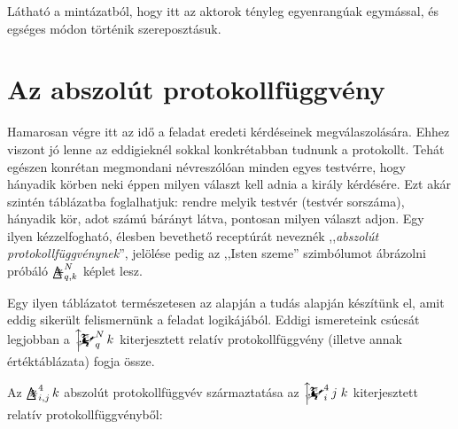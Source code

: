 \documentclass{article}
\newcommand{\eye}{\bigtriangleup\mspace{-14.607mu}\divideontimes}
\newcommand{\eyefun}[4]{\mathop{\eye}^{#1}_{#2,#3}#4}
\newcommand{\mainfunext}[3]{\left\uparrow\!\!\!\mathwitch*_{#2}^{#1}#3\right.}
\begin{document}
	Látható a mintázatból, hogy itt az aktorok tényleg egyenrangúak egymással, és egséges módon történik szereposztásuk.

	\section{Az abszolút protokollfüggvény}

	Hamarosan végre itt az idő a feladat eredeti kérdéseinek megválaszolására. Ehhez viszont jó lenne az eddigieknél sokkal konkrétabban tudnunk a protokollt.
	Tehát egészen konrétan megmondani névreszólóan minden egyes testvérre, hogy hányadik körben neki éppen milyen választ kell adnia a király kérdésére.
	Ezt akár szintén táblázatba foglalhatjuk: rendre melyik testvér (testvér sorszáma), hányadik kör, adot számú bárányt látva, pontosan milyen választ adjon.
	Egy ilyen kézzelfogható, élesben bevethető receptúrát neveznék ,,\emph{abszolút protokollfüggvénynek}'', jelölése pedig az ,,Isten szeme'' szimbólumot ábrázolni próbáló $\eyefun Nqk$ képlet lesz.

	Egy ilyen táblázatot természetesen az alapján a tudás alapján készítünk el, amit eddig sikerült felismernünk a feladat logikájából.
	Eddigi ismereteink csúcsát legjobban a $\mainfunext Nqk$ kiterjesztett relatív protokollfüggvény (illetve annak értéktáblázata) fogja össze.

	Az $\eyefun4ijk$ abszolút protokollfüggvév származtatása az $\mainfunext 4ijk$ kiterjesztett relatív protokollfüggvényből:

	\setlength{\extrarowheight}{8px}
\end{document}

